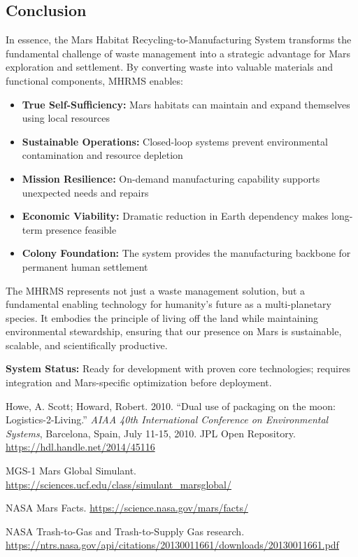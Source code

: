 \documentclass[12pt, a4paper]{article}
\begin{document}
\subsection{Conclusion}

In essence, the Mars Habitat Recycling-to-Manufacturing System transforms the fundamental challenge of waste management into a strategic advantage for Mars exploration and settlement. By converting waste into valuable materials and functional components, MHRMS enables:

\begin{itemize}
    \item \textbf{True Self-Sufficiency:} Mars habitats can maintain and expand themselves using local resources
    \item \textbf{Sustainable Operations:} Closed-loop systems prevent environmental contamination and resource depletion
    \item \textbf{Mission Resilience:} On-demand manufacturing capability supports unexpected needs and repairs
    \item \textbf{Economic Viability:} Dramatic reduction in Earth dependency makes long-term presence feasible
    \item \textbf{Colony Foundation:} The system provides the manufacturing backbone for permanent human settlement
\end{itemize}

The MHRMS represents not just a waste management solution, but a fundamental enabling technology for humanity's future as a multi-planetary species. It embodies the principle of living off the land while maintaining environmental stewardship, ensuring that our presence on Mars is sustainable, scalable, and scientifically productive.

\noindent\textbf{System Status:} Ready for development with proven core technologies; requires integration and Mars-specific optimization before deployment.

\begin{thebibliography}{9}

Howe, A. Scott; Howard, Robert. 2010. ``Dual use of packaging on the moon: Logistics-2-Living.'' \textit{AIAA 40th International Conference on Environmental Systems}, Barcelona, Spain, July 11-15, 2010. JPL Open Repository. \url{https://hdl.handle.net/2014/45116}

MGS-1 Mars Global Simulant. \url{https://sciences.ucf.edu/class/simulant_marsglobal/}

NASA Mars Facts. \url{https://science.nasa.gov/mars/facts/}

NASA Trash-to-Gas and Trash-to-Supply Gas research. \url{https://ntrs.nasa.gov/api/citations/20130011661/downloads/20130011661.pdf}

\end{thebibliography}
\end{document}
